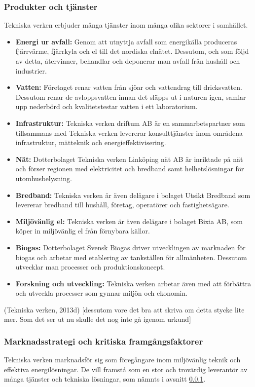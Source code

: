 \documentclass[10pt,a4paper]{article}
\begin{document}
\subsubsection{Produkter och tjänster} \label{subsec:prod}
Tekniska verken erbjuder många tjänster inom många olika sektorer i samhället.
\begin{itemize}
	\item \textbf{Energi ur avfall:} Genom att utnyttja avfall som energikälla
	produceras fjärrvärme, fjärrkyla och el till det nordiska elnätet. Dessutom, och
	som följd av detta, återvinner, behandlar och deponerar man avfall från hushåll
	och industrier.
	\item \textbf{Vatten:} Företaget renar vatten från sjöar och vattendrag till
	dricksvatten. Dessutom renar de avloppsvatten innan det släpps ut i naturen igen, samlar
	upp nederbörd och kvalitetstestar vatten i ett laboratorium.
	\item \textbf{Infrastruktur:} Tekniska verken driftum AB är en sammarbetspartner
	som tillsammans med Tekniska verken levererar konsulttjänster inom områdena infrastruktur,
	mätteknik och energieffektivisering.
	\item \textbf{Nät:} Dotterbolaget Tekniska verken Linköping nät AB är
	inriktade på nät och förser regionen med elektricitet och bredband samt
	helhetslösningar för utomhusbelysning.
	\item \textbf{Bredband:} Tekniska verken är även delägare i bolaget Utsikt
	Bredband som levererar bredband till hushåll, företag, operatörer och fastighetsägare.
	\item \textbf{Miljövänlig el:} Tekniska verken är även delägare i bolaget Bixia
	AB, som köper in miljövänlig el från förnybara källor.
	\item \textbf{Biogas:} Dotterbolaget Svensk Biogas driver utvecklingen av
	marknaden för biogas och arbetar med etablering av tankställen för allmänheten.
	Dessutom utvecklar man processer och produktionskoncept.
	\item \textbf{Forskning och utveckling:} Tekniska verken arbetar även med att
	förbättra och utveckla processer som gynnar miljön och ekonomin.
\end{itemize}

(Tekniska verken, 2013d)
[dessutom vore det bra att skriva om detta stycke lite mer. Som det ser ut nu skulle det nog inte gå igenom urkund]

\subsubsection{Marknadsstrategi och kritiska framgångsfaktorer} \label{subsec:kff}
Tekniska verken marknadsför sig som föregångare inom miljövänlig teknik och
effektiva energilösningar. De vill framstå som en stor och trovärdig leverantör 
av många tjänster och tekniska lösningar, som nämnts i avsnitt \ref{subsec:prod}. 
\end{document}
